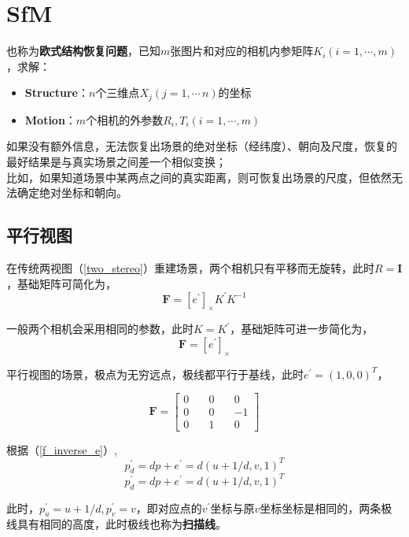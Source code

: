 \section{SfM}
	 也称为\textbf{欧式结构恢复问题}，已知$m$张图片和对应的相机内参矩阵$K_i(i=1,\cdots,m)$，求解：
	\begin{itemize}
		\item \textbf{Structure}：$n$个三维点$X_j(j=1,\cdots\,n)$的坐标
		\item \textbf{Motion}：$m$个相机的外参数$R_i,T_i(i=1,\cdots,m)$
	\end{itemize}		
	
	如果没有额外信息，无法恢复出场景的绝对坐标（经纬度）、朝向及尺度，恢复的最好结果是与真实场景之间差一个相似变换；\\

	比如，如果知道场景中某两点之间的真实距离，则可恢复出场景的尺度，但依然无法确定绝对坐标和朝向。

	\subsection{平行视图}
		在传统两视图（\ref{two_stereo}）重建场景，两个相机只有平移而无旋转，此时$R = \mathbf{I}$，基础矩阵可简化为，
		$$
			\mathbf{F} = [e^\prime]_{\times}K^{\prime}K^{-1}
		$$

		一般两个相机会采用相同的参数，此时$K = K^\prime$，基础矩阵可进一步简化为，
		$$
			\mathbf{F} = [e^\prime]_{\times}
		$$

		平行视图的场景，极点为无穷远点，极线都平行于基线，此时$e^\prime = (1,0,0)^T$，

		$$
			\mathbf{F} =  \begin{bmatrix}
				0\quad & 0\quad& 0\\
				0\quad & 0\quad& -1\\
				0\quad & 1\quad& 0
			\end{bmatrix}
		$$

		根据（\ref{f_inverse_e}）,
		\begin{equation}
			p^\prime_d = dp + e^\prime = d(u+1/d,v,1)^T \label{disparity_pair}
		\end{equation}
		$$
			p^\prime_d = dp + e^\prime = d(u+1/d,v,1)^T
		$$

		此时，$p^\prime_u = u + 1/d, p^\prime_v = v$，即对应点的$v^\prime$坐标与原$v$坐标坐标是相同的，两条极线具有相同的高度，此时极线也称为\textbf{扫描线}。

